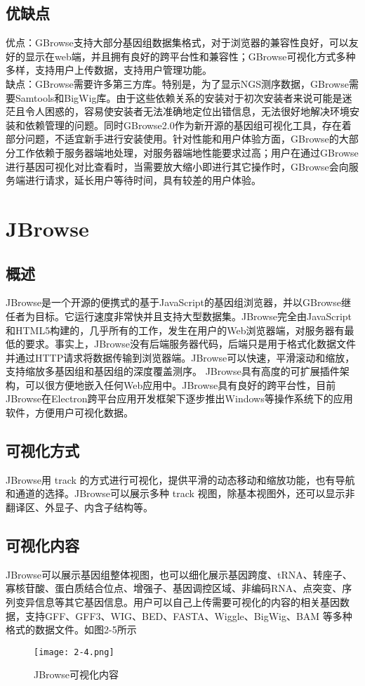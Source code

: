 		\subsection{优缺点}
		优点：GBrowse支持大部分基因组数据集格式，对于浏览器的兼容性良好，可以友好的显示在web端，并且拥有良好的跨平台性和兼容性；GBrowse可视化方式多种多样，支持用户上传数据，支持用户管理功能。\\
		\indent 缺点：GBrowse需要许多第三方库。特别是，为了显示NGS测序数据，GBrowse需要Samtools和BigWig库。由于这些依赖关系的安装对于初次安装者来说可能是迷茫且令人困惑的，容易使安装者无法准确地定位出错信息，无法很好地解决环境安装和依赖管理的问题。同时GBrowse2.0作为新开源的基因组可视化工具，存在着部分问题，不适宜新手进行安装使用。针对性能和用户体验方面，GBrowse的大部分工作依赖于服务器端地处理，对服务器端地性能要求过高；用户在通过GBrowse进行基因可视化对比查看时，当需要放大缩小即进行其它操作时，GBrowse会向服务端进行请求，延长用户等待时间，具有较差的用户体验。
	\section{JBrowse}
		\subsection{概述}
		JBrowse是一个开源的便携式的基于JavaScript的基因组浏览器，并以GBrowse继任者为目标。它运行速度非常快并且支持大型数据集。JBrowse完全由JavaScript和HTML5构建的，几乎所有的工作，发生在用户的Web浏览器端，对服务器有最低的要求。事实上，JBrowse没有后端服务器代码，后端只是用于格式化数据文件并通过HTTP请求将数据传输到浏览器端。JBrowse可以快速，平滑滚动和缩放，支持缩放多基因组和基因组的深度覆盖测序。 JBrowse具有高度的可扩展插件架构，可以很方便地嵌入任何Web应用中。JBrowse具有良好的跨平台性，目前JBrowse在Electron跨平台应用开发框架下逐步推出Windows等操作系统下的应用软件，方便用户可视化数据。
		\subsection{可视化方式}
		JBrowse用 track 的方式进行可视化，提供平滑的动态移动和缩放功能，也有导航和通道的选择。JBrowse可以展示多种 track 视图，除基本视图外，还可以显示非翻译区、外显子、内含子结构等。
		
		\subsection{可视化内容}
		JBrowse可以展示基因组整体视图，也可以细化展示基因跨度、tRNA、转座子、寡核苷酸、蛋白质结合位点、增强子、基因调控区域、非编码RNA、点突变、序列变异信息等其它基因信息。用户可以自己上传需要可视化的内容的相关基因数据，支持GFF、GFF3、WIG、BED、FASTA、Wiggle、BigWig、BAM 等多种格式的数据文件。如图2-5所示
		\begin{figure}[!ht]
			\centering
			\texttt{[image: 2-4.png]}
			\caption{JBrowse可视化内容}
		\end{figure}
